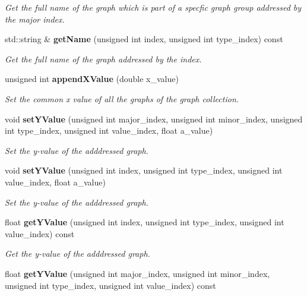 \begin{DoxyCompactItemize}
\begin{DoxyCompactList}\small\item\em Get the full name of the graph which is part of a specfic graph group addressed by the major index. \item\end{DoxyCompactList}\item 
std::string \& {\bf getName} (unsigned int index, unsigned int type\_\-index) const 
\begin{DoxyCompactList}\small\item\em Get the full name of the graph addressed by the index. \item\end{DoxyCompactList}\item 
unsigned int {\bf appendXValue} (double x\_\-value)
\begin{DoxyCompactList}\small\item\em Set the common x value of all the graphs of the graph collection. \item\end{DoxyCompactList}\item 
void {\bf setYValue} (unsigned int major\_\-index, unsigned int minor\_\-index, unsigned int type\_\-index, unsigned int value\_\-index, float a\_\-value)\label{classhistmgr_1_1GraphCollection__t_a2d86a21418a91537e8cb831673b4e88b}

\begin{DoxyCompactList}\small\item\em Set the y-\/value of the adddressed graph. \item\end{DoxyCompactList}\item 
void {\bf setYValue} (unsigned int index, unsigned int type\_\-index, unsigned int value\_\-index, float a\_\-value)\label{classhistmgr_1_1GraphCollection__t_afa630f68afc52b4f115fe35e1c652119}

\begin{DoxyCompactList}\small\item\em Set the y-\/value of the adddressed graph. \item\end{DoxyCompactList}\item 
float {\bf getYValue} (unsigned int index, unsigned int type\_\-index, unsigned int value\_\-index) const \label{classhistmgr_1_1GraphCollection__t_aa897bd01a3c31af0e8b82dbef6b57271}

\begin{DoxyCompactList}\small\item\em Get the y-\/value of the adddressed graph. \item\end{DoxyCompactList}\item 
float {\bf getYValue} (unsigned int major\_\-index, unsigned int minor\_\-index, unsigned int type\_\-index, unsigned int value\_\-index) const \label{classhistmgr_1_1GraphCollection__t_a16f16887fc54666fca9fb47c8d45a6d0}


\end{DoxyCompactItemize}
